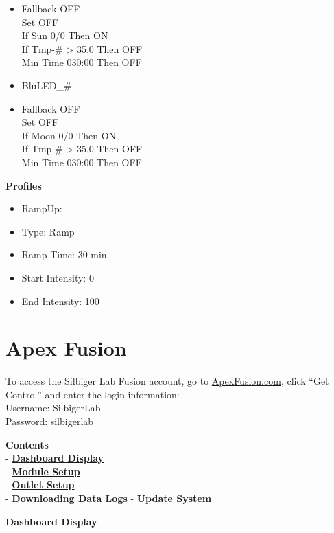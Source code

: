 \documentclass[]{book}
\providecommand{\tightlist}{%
  \setlength{\itemsep}{0pt}\setlength{\parskip}{0pt}}
\begin{document}
\begin{itemize}
\item
  Fallback OFF\\
  Set OFF\\
  If Sun 0/0 Then ON\\
  If Tmp-\# \textgreater{} 35.0 Then OFF\\
  Min Time 030:00 Then OFF
\item
  BluLED\_\#
\item
  Fallback OFF\\
  Set OFF\\
  If Moon 0/0 Then ON\\
  If Tmp-\# \textgreater{} 35.0 Then OFF\\
  Min Time 030:00 Then OFF
\end{itemize}

 \textbf{Profiles}

\begin{itemize}
\tightlist
\item
  RampUp:
\item
  Type: Ramp
\item
  Ramp Time: 30 min
\item
  Start Intensity: 0
\item
  End Intensity: 100
\end{itemize}

\chapter{Apex Fusion}\label{apex-fusion}

To access the Silbiger Lab Fusion account, go to
\href{https://apexfusion.com}{ApexFusion.com}, click ``Get Control'' and
enter the login information:\\
Username: SilbigerLab\\
Password: silbigerlab

\textbf{Contents}\\
- \protect\hyperlink{Dashboard}{\textbf{Dashboard Display}}\\
- \protect\hyperlink{Module_Setup}{\textbf{Module Setup}}\\
- \protect\hyperlink{Outlet_Setup}{\textbf{Outlet Setup}}\\
- \protect\hyperlink{Data_Logs}{\textbf{Downloading Data Logs}} -
\protect\hyperlink{Update}{\textbf{Update System}}

 \textbf{Dashboard Display}
\end{document}

